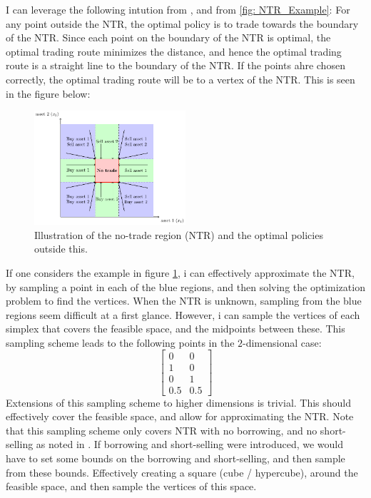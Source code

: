 \documentclass[11pt]{article}
\begin{document}
I can leverage the following intution from \autocite{Scheidegger2023}, and from \ref{fig: NTR_Example}: For any point outside the \ac{NTR},
the optimal policy is to trade towards the boundary of the \ac{NTR}. Since each point on the boundary of the NTR is optimal, the optimal trading route minimizes the
distance, and hence the optimal trading route is a straight line to the boundary of the \ac{NTR}. If the points ahre chosen correctly, the optimal trading route will be to a vertex of the \ac{NTR}.
This is seen in the figure below:\\
\begin{figure}[!ht]
  \centering
  \includegraphics[width=0.5\textwidth]{../Sections/tikzfigure.pdf} %
  \caption{Illustration of the no-trade region (NTR) and the optimal policies outside this.}
  \label{fig:no_trade_region_schematic}
\end{figure}
If one considers the example in figure \ref{fig:no_trade_region_schematic}, i can effectively approximate the \ac{NTR},
by sampling a point in each of the blue regions, and then solving the optimization problem to find the vertices.
When the \ac{NTR} is unknown, sampling from the blue regions seem difficult at a first glance.
However, i can sample the vertices of each simplex that covers the feasible space, and the midpoints between these.
This sampling scheme leads to the following points in the $2$-dimensional case:
\[
  \begin{bmatrix}
    0 & 0 \\
    1 & 0 \\
    0 & 1 \\
    0.5 & 0.5 
  \end{bmatrix}
\]
Extensions of this sampling scheme to higher dimensions is trivial.
This should effectively cover the feasible space, and allow for approximating the \ac{NTR}. Note that this sampling scheme only covers \ac{NTR}
with no borrowing, and no short-selling as noted in \autocite{Scheidegger2023}. If borrowing and short-selling were introduced, we would have to set some bounds on the borrowing and short-selling,
and then sample from these bounds. Effectively creating a square (cube / hypercube), around the feasible space, and then sample the vertices of this space.
\end{document}
